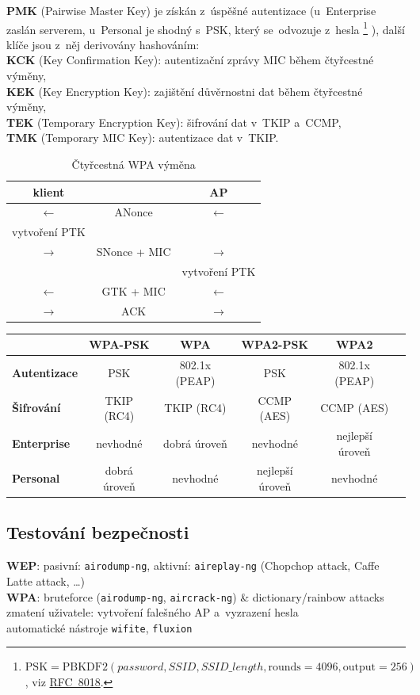 \vspace*{1em}\noindent
\textbf{PMK} (Pairwise Master Key) je získán z~úspěšné autentizace (u~Enterprise zaslán serverem, u~Personal je shodný s~PSK, který se~odvozuje z~hesla%
\footnote{$\mathrm{PSK} = \mathrm{PBKDF2}(password, SSID, SSID\_length, \mathrm{rounds}=4096, \mathrm{output}=256)$, viz \href{https://datatracker.ietf.org/doc/html/rfc8018}{RFC~8018}.}%
), další klíče jsou z~něj derivovány hashováním: \\
\textbf{KCK} (Key Confirmation Key): autentizační zprávy MIC během čtyřcestné výměny, \\
\textbf{KEK} (Key Encryption Key): zajištění důvěrnostni dat během čtyřcestné výměny, \\
\textbf{TEK} (Temporary Encryption Key): šifrování dat v~TKIP a~CCMP, \\
\textbf{TMK} (Temporary MIC Key): autentizace dat v~TKIP.

\begin{table}[ht]
\centering
\begin{tabular}{ccc}
\textbf{klient} && \textbf{AP} \\
\hline
$\leftarrow$ & ANonce & $\leftarrow$ \\
vytvoření PTK && \\
$\rightarrow$ & SNonce + MIC & $\rightarrow$ \\
&& vytvoření PTK \\
$\leftarrow$ & GTK + MIC & $\leftarrow$ \\
$\rightarrow$ & ACK & $\rightarrow$ \\
\end{tabular}
\caption*{Čtyřcestná WPA výměna}
\end{table}

\begin{table}[ht]
\centering
\begin{tabular}{l|ccccc}
& \textbf{WPA-PSK} & \textbf{WPA} & \textbf{WPA2-PSK} & \textbf{WPA2} \\
\hline
\textbf{Autentizace} & PSK & 802.1x (PEAP) & PSK & 802.1x (PEAP) \\
\textbf{Šifrování} & TKIP (RC4) & TKIP (RC4) & CCMP (AES) & CCMP (AES) \\
\textbf{Enterprise} & nevhodné & dobrá úroveň & nevhodné & nejlepší úroveň \\
\textbf{Personal} & dobrá úroveň & nevhodné & nejlepší úroveň & nevhodné \\
\end{tabular}
\end{table}

\subsection{Testování bezpečnosti}

\textbf{WEP}: pasivní: \texttt{airodump-ng}, aktivní: \texttt{aireplay-ng} (Chopchop attack, Caffe Latte attack, \dots) \\
\textbf{WPA}: bruteforce (\texttt{airodump-ng}, \texttt{aircrack-ng}) \& dictionary/rainbow attacks \\
zmatení uživatele: vytvoření falešného AP a~vyzrazení hesla \\
automatické nástroje \texttt{wifite}, \texttt{fluxion}
